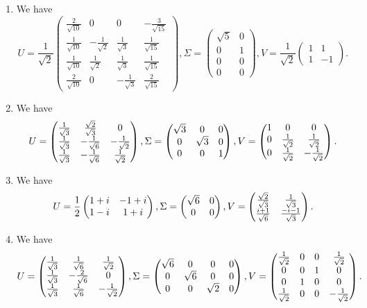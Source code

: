 \begin{enumerate}
\begin{enumerate}
\item We have 
\[U=\frac{1}{\sqrt{2}}\begin{pmatrix}\frac{2}{\sqrt{10}}&0&0&-\frac{3}{\sqrt{15}}\\\frac{1}{\sqrt{10}}&-\frac{1}{\sqrt{2}}&\frac{1}{\sqrt{3}}&\frac{1}{\sqrt{15}}\\\frac{1}{\sqrt{10}}&\frac{1}{\sqrt{2}}&\frac{1}{\sqrt{3}}&\frac{1}{\sqrt{15}}\\\frac{2}{\sqrt{10}}&0&-\frac{1}{\sqrt{3}}&\frac{2}{\sqrt{15}}\end{pmatrix} ,\Sigma =\begin{pmatrix}\sqrt{5}&0\\0&1\\0&0\\0&0\end{pmatrix},V=\frac{1}{\sqrt{2}}\begin{pmatrix}1&1\\1&-1\end{pmatrix}.\]
\item We have 
\[U=\begin{pmatrix}\frac{1}{\sqrt{3}} & \frac{\sqrt{2}}{\sqrt{3}} & 0\cr \frac{1}{\sqrt{3}} & -\frac{1}{\sqrt{6}} & -\frac{1}{\sqrt{2}}\cr \frac{1}{\sqrt{3}} & -\frac{1}{\sqrt{6}} & \frac{1}{\sqrt{2}}\end{pmatrix} ,\Sigma =\begin{pmatrix}\sqrt{3}&0&0\\0&\sqrt{3}&0\\0&0&1\end{pmatrix},V=\begin{pmatrix}1 & 0 & 0\cr 0 & \frac{1}{\sqrt{2}} & \frac{1}{\sqrt{2}}\cr 0 & \frac{1}{\sqrt{2}} & -\frac{1}{\sqrt{2}}\end{pmatrix}.\]
\item We have 
\[U=\frac{1}{2}\begin{pmatrix}1+i&-1+i\\1-i&1+i\end{pmatrix} ,\Sigma =\begin{pmatrix}\sqrt{6}&0\\0&0\end{pmatrix},V=\begin{pmatrix}\frac{\sqrt{2}}{\sqrt{3}} & \frac{1}{\sqrt{3}}\cr \frac{i+1}{\sqrt{6}} & \frac{-i-1}{\sqrt{3}}\end{pmatrix}.\]
\item We have 
\[U=\begin{pmatrix}\frac{1}{\sqrt{3}} & \frac{1}{\sqrt{6}} & \frac{1}{\sqrt{2}}\cr \frac{1}{\sqrt{3}} & -\frac{2}{\sqrt{6}} & 0\cr \frac{1}{\sqrt{3}} & \frac{1}{\sqrt{6}} & -\frac{1}{\sqrt{2}}\end{pmatrix} ,\Sigma =\begin{pmatrix}\sqrt{6}&0&0&0\\0&\sqrt{6}&0&0\\0&0&\sqrt{2}&0\end{pmatrix},V=\begin{pmatrix}\frac{1}{\sqrt{2}} & 0 & 0 & \frac{1}{\sqrt{2}}\cr 0 & 0 & 1 & 0\cr 0 & 1 & 0 & 0\cr \frac{1}{\sqrt{2}} & 0 & 0 & -\frac{1}{\sqrt{2}}\end{pmatrix}.\]

\end{enumerate}
\end{enumerate}
